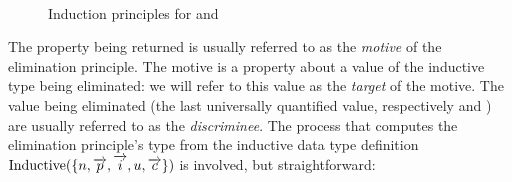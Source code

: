\begin{figure*}[!htp]
  \caption{Induction principles for  and }~\label{list-ind-vec-ind}

\end{figure*}

The property being returned  is usually referred to as the
\textit{motive} of the elimination principle.  The motive is a property about a
value of the inductive type being eliminated: we will refer to this value as the
\textit{target} of the motive.  The value being eliminated (the last
universally quantified value, respectively  and ) are
usually referred to as the \textit{discriminee}.  The process that computes the
elimination principle's type from the inductive data type definition
$\text{Inductive}(\{ n, \overrightarrow{p}, \overrightarrow{i}, u, \overrightarrow{c} \})$
is involved, but straightforward:

